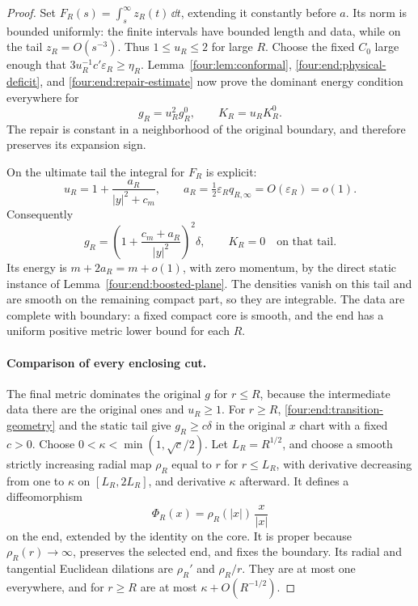 \begin{proof}
Set \(F_R(s)=\int_s^\infty z_R(t)\,\dd t\), extending it constantly
before \(a\). Its norm is bounded uniformly: the finite intervals have
bounded length and data, while on the tail \(z_R=O(s^{-3})\).
Thus \(1\le u_R\le2\) for large \(R\).
Choose the fixed \(C_0\) large enough that
\(3u_R^{-1}c'\varepsilon_R\ge\eta_R\). Lemma~\ref{four:lem:conformal},
\eqref{four:end:physical-deficit}, and \eqref{four:end:repair-estimate} now prove
the dominant energy condition everywhere for
\[
 g_R=u_R^2g_R^0,\qquad K_R=u_RK_R^0.
\]
The repair is constant in a neighborhood of the original boundary, and
therefore preserves its expansion sign.

On the ultimate tail the integral for \(F_R\) is explicit:
\[
 u_R=1+\frac{a_R}{|y|^2+c_m},\qquad
 a_R=\tfrac12\varepsilon_Rq_{R,\infty}=O(\varepsilon_R)=o(1).
\]
Consequently
\begin{equation}\label{four:end:static-repaired-metric}
 g_R=\left(1+\frac{c_m+a_R}{|y|^2}\right)^2\delta,
 \qquad K_R=0
 \quad\text{on that tail}.
\end{equation}
Its energy is \(m+2a_R=m+o(1)\), with zero momentum, by the direct
static instance of Lemma~\ref{four:end:boosted-plane}. The densities vanish
on this tail and are smooth on the remaining compact part, so they are
integrable. The data are complete with boundary: a fixed compact core
is smooth, and the end has a uniform positive metric lower bound for
each \(R\).

\paragraph{Comparison of every enclosing cut.}
The final metric dominates the original \(g\) for \(r\le R\), because
the intermediate data there are the original ones and \(u_R\ge1\).
For \(r\ge R\), \eqref{four:end:transition-geometry} and the static tail
give \(g_R\ge c\delta\) in the original \(x\) chart with a fixed
\(c>0\). Choose \(0<\kappa<\min(1,\sqrt c/2)\).
Let \(L_R=R^{1/2}\), and choose a smooth strictly increasing radial map
\(\rho_R\) equal to \(r\) for \(r\le L_R\), with derivative decreasing
from one to \(\kappa\) on \([L_R,2L_R]\), and derivative \(\kappa\)
afterward. It defines a diffeomorphism
\[
 \Phi_R(x)=\rho_R(|x|)\,\frac{x}{|x|}
\]
on the end, extended by the identity on the core. It is proper because
\(\rho_R(r)\to\infty\), preserves the selected end, and fixes the
boundary. Its radial and tangential Euclidean dilations are
\(\rho_R'\) and \(\rho_R/r\). They are at most one everywhere, and
for \(r\ge R\) are at most \(\kappa+O(R^{-1/2})\).


\end{proof}
